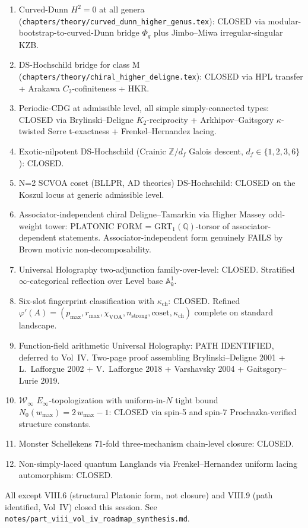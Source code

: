 \documentclass[11pt]{article}
\begin{document}
\begin{remark}
\begin{remark}
\begin{enumerate}
\item[VIII.1] Curved-Dunn $H^2 = 0$ at all genera
(\texttt{chapters/theory/curved\_dunn\_higher\_genus.tex}): CLOSED
via modular-bootstrap-to-curved-Dunn bridge $\Phi_g$ plus Jimbo--Miwa
irregular-singular KZB.
\item[VIII.2] DS-Hochschild bridge for class M
(\texttt{chapters/theory/chiral\_higher\_deligne.tex}): CLOSED via
HPL transfer + Arakawa $C_2$-cofiniteness + HKR.
\item[VIII.3] Periodic-CDG at admissible level, all simple simply-connected
types: CLOSED via Brylinski--Deligne $K_2$-reciprocity + Arkhipov--Gaitsgory
$\kappa$-twisted Serre t-exactness + Frenkel--Hernandez lacing.
\item[VIII.4] Exotic-nilpotent DS-Hochschild (Crainic $\mathbb{Z}/d_f$
Galois descent, $d_f \in \{1, 2, 3, 6\}$): CLOSED.
\item[VIII.5] N=2 SCVOA coset (BLLPR, AD theories) DS-Hochschild: CLOSED
on the Koszul locus at generic admissible level.
\item[VIII.6] Associator-independent chiral Deligne--Tamarkin via
Higher Massey odd-weight tower: PLATONIC FORM = GRT$_1(\mathbb{Q})$-torsor
of associator-dependent statements. Associator-independent form
genuinely FAILS by Brown motivic non-decomposability.
\item[VIII.7] Universal Holography two-adjunction family-over-level:
CLOSED. Stratified $\infty$-categorical reflection over Level
base $\mathbb{A}^1_k$.
\item[VIII.8] Six-slot fingerprint classification with $\kappa_{\mathrm{ch}}$:
CLOSED. Refined $\varphi'(A) = (p_{\max}, r_{\max}, \chi_{\mathrm{VOA}},
n_{\mathrm{strong}}, \mathrm{coset}, \kappa_{\mathrm{ch}})$ complete
on standard landscape.
\item[VIII.9] Function-field arithmetic Universal Holography: PATH
IDENTIFIED, deferred to Vol~IV. Two-page proof assembling
Brylinski--Deligne 2001 + L.~Lafforgue 2002 + V.~Lafforgue 2018 +
Varshavsky 2004 + Gaitsgory--Lurie 2019.
\item[VIII.10] $\mathcal{W}_{\infty}$ $E_{\infty}$-topologization with
uniform-in-$N$ tight bound $N_0(w_{\max}) = 2\,w_{\max} - 1$: CLOSED
via spin-5 and spin-7 Prochazka-verified structure constants.
\item[VIII.11] Monster Schellekens 71-fold three-mechanism
chain-level closure: CLOSED.
\item[VIII.12] Non-simply-laced quantum Langlands via Frenkel--Hernandez
uniform lacing automorphism: CLOSED.
\end{enumerate}
All except VIII.6 (structural Platonic form, not closure) and VIII.9
(path identified, Vol~IV) closed this session. See
\texttt{notes/part\_viii\_vol\_iv\_roadmap\_synthesis.md}.


\end{remark}
\end{remark}
\end{document}
